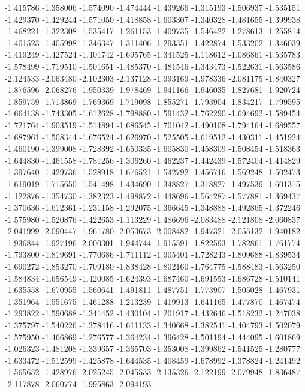 -1.415786
-1.358006
-1.574090
-1.474444
-1.439266
-1.315193
-1.506937
-1.535151
-1.429370
-1.429244
-1.571050
-1.418858
-1.603307
-1.340328
-1.481655
-1.399938
-1.468221
-1.322308
-1.535417
-1.261153
-1.409735
-1.546422
-1.278613
-1.255814
-1.401523
-1.405998
-1.346347
-1.311406
-1.293351
-1.422874
-1.533202
-1.346039
-1.419249
-1.427524
-1.401742
-1.695765
-1.341525
-1.118612
-1.086861
-1.535783
-1.578499
-1.719510
-1.501651
-1.485370
-1.481546
-1.343473
-1.522631
-1.563586
-2.124533
-2.063480
-2.102303
-2.137128
-1.993169
-1.978336
-2.081175
-1.840327
-1.876596
-2.068276
-1.950339
-1.978469
-1.941166
-1.946035
-1.827681
-1.920724
-1.859759
-1.713869
-1.769369
-1.719098
-1.855271
-1.793904
-1.834217
-1.799595
-1.664138
-1.743305
-1.612628
-1.798880
-1.591432
-1.762290
-1.694692
-1.589454
-1.721764
-1.903519
-1.514894
-1.686545
-1.701042
-1.490108
-1.794164
-1.689557
-1.687961
-1.508344
-1.676524
-1.626970
-1.525505
-1.619512
-1.430311
-1.451924
-1.460190
-1.399008
-1.728392
-1.650335
-1.605830
-1.458309
-1.508454
-1.518363
-1.644830
-1.461558
-1.781256
-1.306260
-1.462237
-1.442439
-1.572404
-1.414829
-1.397640
-1.429736
-1.528918
-1.676521
-1.542792
-1.456716
-1.569248
-1.502473
-1.619019
-1.715650
-1.541498
-1.434690
-1.348827
-1.318827
-1.497539
-1.601315
-1.122876
-1.354730
-1.382323
-1.498872
-1.448696
-1.564287
-1.577881
-1.369437
-1.370636
-1.612361
-1.231158
-1.292075
-1.366645
-1.348888
-1.492865
-1.372246
-1.575980
-1.520876
-1.422653
-1.113229
-1.486696
-2.083488
-2.121808
-2.060837
-2.041999
-2.090447
-1.961780
-2.053673
-2.008482
-1.947321
-2.055132
-1.940182
-1.936844
-1.927196
-2.000301
-1.944744
-1.915591
-1.822593
-1.782861
-1.761774
-1.793800
-1.819691
-1.770686
-1.711112
-1.905401
-1.728243
-1.809688
-1.839534
-1.690272
-1.853270
-1.709180
-1.838428
-1.802160
-1.764775
-1.588483
-1.563250
-1.584834
-1.656549
-1.420085
-1.624393
-1.687460
-1.691553
-1.686728
-1.510141
-1.635558
-1.670955
-1.560641
-1.491811
-1.487751
-1.773907
-1.505028
-1.467931
-1.351964
-1.551675
-1.461288
-1.213239
-1.419913
-1.641165
-1.477870
-1.467474
-1.293822
-1.590688
-1.341452
-1.430104
-1.201917
-1.432646
-1.518232
-1.247038
-1.375797
-1.540226
-1.378416
-1.611133
-1.340668
-1.382541
-1.404793
-1.502079
-1.575950
-1.466869
-1.276577
-1.364234
-1.396428
-1.501194
-1.444095
-1.601869
-1.026323
-1.481208
-1.339657
-1.365703
-1.353008
-1.399862
-1.541525
-1.280777
-1.633472
-1.512599
-1.425878
-1.644535
-1.408459
-1.678992
-1.378824
-1.241492
-1.565652
-1.428976
-2.025245
-2.045533
-2.135326
-2.122199
-2.079948
-1.836487
-2.117878
-2.060774
-1.995863
-2.094193
